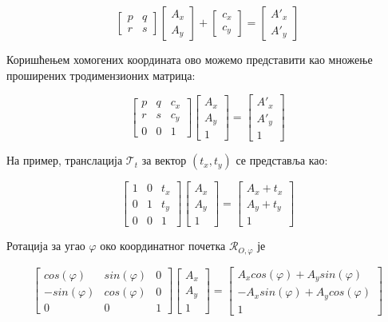 \documentclass[12pt]{report}
\begin{document}
\[\begin{bmatrix}p & q\\ r & s\end{bmatrix} \begin{bmatrix}A_x\\ A_y \end{bmatrix} + \begin{bmatrix}c_x\\ c_y\end{bmatrix} = \begin{bmatrix}A'_x\\ A'_y \end{bmatrix}\]

Коришћењем хомогених координата ово можемо представити као множење
проширених тродимензионих матрица:

\[\begin{bmatrix}p & q & c_x\\ r & s&c_y \\ 0 & 0 & 1\end{bmatrix} \begin{bmatrix}A_x\\ A_y\\1\end{bmatrix} = 
\begin{bmatrix}A'_x\\ A'_y\\1\end{bmatrix}\]

На пример, транслација $\mathcal{T}_t$ за вектор \((t_x, t_y)\) се представља као:

\[\begin{bmatrix}1 & 0 & t_x\\ 0 & 1&t_y \\ 0 & 0 & 1\end{bmatrix} \begin{bmatrix}A_x\\ A_y\\1\end{bmatrix} = 
\begin{bmatrix}A_x+t_x\\ A_y+t_y\\1\end{bmatrix}\]

Ротација за угао $\varphi$ око координатног почетка $\mathcal{R}_{O,\varphi}$  је

\[\begin{bmatrix}cos(\varphi) & sin(\varphi) & 0\\ -sin(\varphi) & cos(\varphi)&0 \\ 0 & 0 & 1\end{bmatrix} \begin{bmatrix}A_x\\ A_y\\1\end{bmatrix} = 
\begin{bmatrix}A_x  cos(\varphi) +  A_y  sin(\varphi)\\ -A_x  sin(\varphi) + A_y  cos(\varphi)\\1\end{bmatrix}\]
\end{document}
